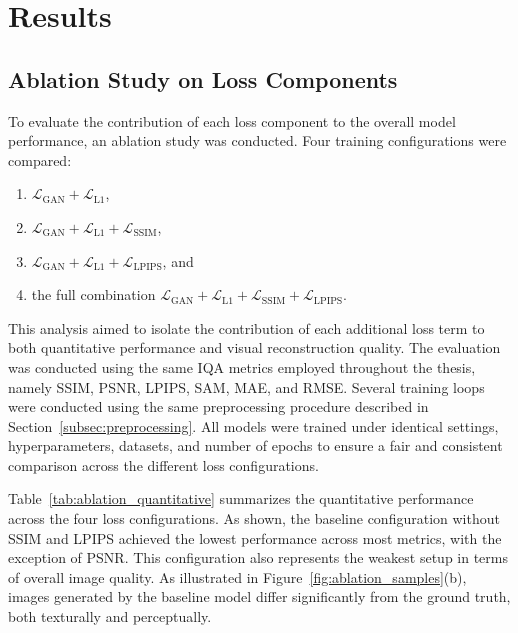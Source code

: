 \chapter{Results}
\section{Ablation Study on Loss Components}
\label{sec:ablation_loss}

To evaluate the contribution of each loss component to the overall model performance, an ablation study was conducted. Four training configurations were compared:
\begin{enumerate}
    \item $\mathcal{L}_{\text{GAN}} + \mathcal{L}_{\text{L1}}$,
    \item $\mathcal{L}_{\text{GAN}} + \mathcal{L}_{\text{L1}} + \mathcal{L}_{\text{SSIM}}$,
    \item $\mathcal{L}_{\text{GAN}} + \mathcal{L}_{\text{L1}} + \mathcal{L}_{\text{LPIPS}}$, and
    \item the full combination $\mathcal{L}_{\text{GAN}} + \mathcal{L}_{\text{L1}} + \mathcal{L}_{\text{SSIM}} + \mathcal{L}_{\text{LPIPS}}$.
\end{enumerate}
This analysis aimed to isolate the contribution of each additional loss term to both quantitative performance and visual reconstruction quality. The evaluation was conducted using the same IQA metrics employed throughout the thesis, namely SSIM, PSNR, LPIPS, SAM, MAE, and RMSE. Several training loops were conducted using the same preprocessing procedure described in Section~\ref{subsec:preprocessing}. All models were trained under identical settings, hyperparameters, datasets, and number of epochs to ensure a fair and consistent comparison across the different loss configurations.

Table~\ref{tab:ablation_quantitative} summarizes the quantitative performance across the four loss configurations. As shown, the baseline configuration without SSIM and LPIPS achieved the lowest performance across most metrics, with the exception of PSNR. This configuration also represents the weakest setup in terms of overall image quality. As illustrated in Figure~\ref{fig:ablation_samples}(b), images generated by the baseline model differ significantly from the ground truth, both texturally and perceptually. 

